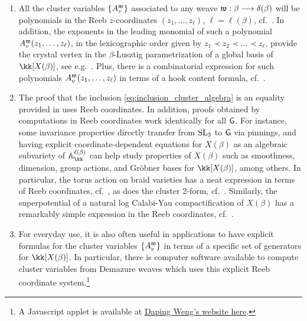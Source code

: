 \begin{enumerate}

    \item All the cluster variables $\{A^{\mathfrak{w}}_v\}$ associated to any weave $\mathfrak{w}:\beta\longrightarrow\delta(\beta)$ will be polynomials in the Reeb $z$-coordinates $(z_1,\ldots,z_\ell)$, $\ell=\ell(\beta)$, cf.~. In addition, the exponents in the leading monomial of such a polynomial $A^{\mathfrak{w}}_v(z_1,\ldots,z_\ell)$, in the lexicographic order given by $z_1\prec z_2\prec \ldots\prec z_\ell$, provide the crystal vertex in the $\beta$-Lusztig parametrization of a global basis of $\kk[X(\beta)]$, see e.g.~. Plus, there is a combinatorial expression for such polynomials $A^{\mathfrak{w}}_v(z_1,\ldots,z_\ell)$ in terms of a hook content formula, cf.~.\\
    
    \item The proof that the inclusion \cref{eq:inclusion_cluster_algebra} is an equality provided in \cite[Section 5]{CGGLSS25} uses Reeb coordinates. In addition, proofs obtained by computations in Reeb coordinates work identically for all $\mathsf{G}$. For instance, some invariance properties directly transfer from $\operatorname{SL}_3$ to $\mathsf{G}$ via pinnings, and having explicit coordinate-dependent equations for $X(\beta)$ as an algebraic subvariety of $\mathbb{A}_\kk^{\ell(\beta)}$ can help study properties of $X(\beta)$ such as smoothness, dimension, group actions, and Gr\"obner bases for $\kk[X(\beta)]$, among others. In particular, the torus action on braid varieties has a neat expression in terms of Reeb coordinates, cf.~, as does the cluster 2-form, cf.~. Similarly, the superpotential of a natural log Calabi-Yau compactification of $X(\beta)$ has a remarkably simple expression in the Reeb coordinates, cf.~.\\
    
    \item For everyday use, it is also often useful in applications to have explicit formulas for the cluster variables $\{A^{\mathfrak{w}}_v\}$ in terms of a specific set of generators for $\kk[X(\beta)]$. In particular, there is computer software available to compute cluster variables from Demazure weaves which uses this explicit Reeb coordinate system.\footnote{A Javascript applet is available at \href{https://daping-weng.github.io/math/demazure_weave.html}{Daping Weng's website here}.}
\end{enumerate}


